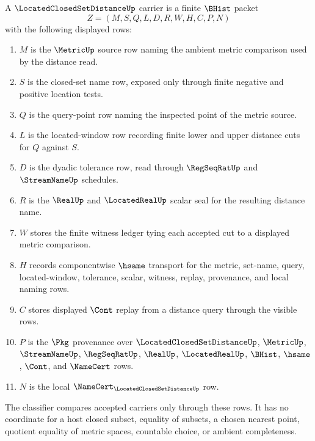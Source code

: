 \begin{definition}
\label{def:located-closed-set-distance-carrier}
A $\LocatedClosedSetDistanceUp$ carrier is a finite $\BHist$ packet
$$
Z=(M,S,Q,L,D,R,W,H,C,P,N)
$$
with the following displayed rows:
\begin{enumerate}
\item $M$ is the $\MetricUp$ source row naming the ambient metric comparison used by the distance read.
\item $S$ is the closed-set name row, exposed only through finite negative and positive location tests.
\item $Q$ is the query-point row naming the inspected point of the metric source.
\item $L$ is the located-window row recording finite lower and upper distance cuts for $Q$ against $S$.
\item $D$ is the dyadic tolerance row, read through $\RegSeqRatUp$ and $\StreamNameUp$ schedules.
\item $R$ is the $\RealUp$ and $\LocatedRealUp$ scalar seal for the resulting distance name.
\item $W$ stores the finite witness ledger tying each accepted cut to a displayed metric comparison.
\item $H$ records componentwise $\hsame$ transport for the metric, set-name, query, located-window, tolerance, scalar, witness, replay, provenance, and local naming rows.
\item $C$ stores displayed $\Cont$ replay from a distance query through the visible rows.
\item $P$ is the $\Pkg$ provenance over $\LocatedClosedSetDistanceUp$, $\MetricUp$, $\StreamNameUp$, $\RegSeqRatUp$, $\RealUp$, $\LocatedRealUp$, $\BHist$, $\hsame$, $\Cont$, and $\NameCert$ rows.
\item $N$ is the local $\NameCert_{\LocatedClosedSetDistanceUp}$ row.
\end{enumerate}
The classifier compares accepted carriers only through these rows. It has no coordinate for a host closed subset, equality of subsets, a chosen nearest point, quotient equality of metric spaces, countable choice, or ambient completeness.
\end{definition}

